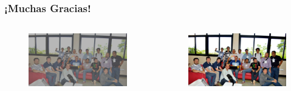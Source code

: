 \documentclass[usenames,dvipsnames]{beamer}
\begin{document}
\begin{frame}
\frametitle{¡Muchas Gracias!}  
\begin{columns}[onlytextwidth]
\begin{column}{.45\textwidth}
\begin{figure}
  \includegraphics[width=1.3\textwidth]{graphics/fin__lc.jpg}
  \caption{}
\end{figure}
\end{column}
\hfill
\begin{column}{.45\textwidth}
		\begin{figure}
		  \includegraphics[width=1.3\textwidth]{graphics/fin_lc.jpg}
		  \caption{}
		\end{figure}
\end{column}
\end{columns}
\end{frame}

\end{document}
